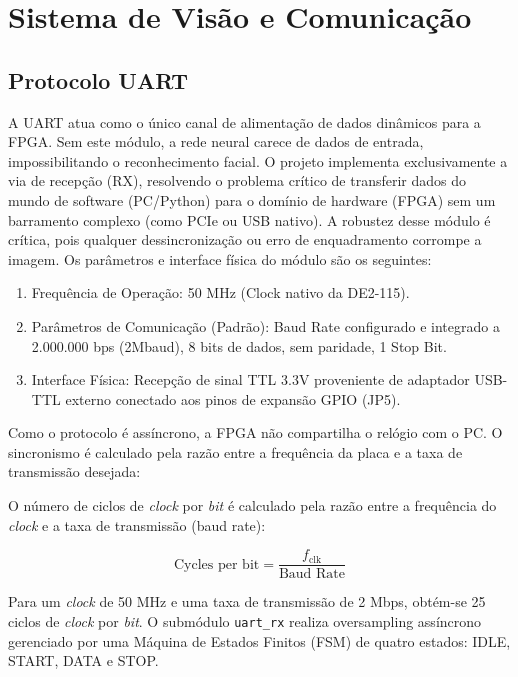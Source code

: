 \chapter{Sistema de Visão e Comunicação}
\section{Protocolo UART}
A UART atua como o único canal de alimentação de dados dinâmicos para a FPGA. Sem este módulo, a rede neural carece de dados de entrada, impossibilitando o reconhecimento facial. O projeto implementa exclusivamente a via de recepção (RX), resolvendo o problema crítico de transferir dados do mundo de software (PC/Python) para o domínio de hardware (FPGA) sem um barramento complexo (como PCIe ou USB nativo). A robustez desse módulo é crítica, pois qualquer dessincronização ou erro de enquadramento corrompe a imagem. 
Os parâmetros e interface física do módulo são os seguintes:
\begin{enumerate}[nosep]
    \item Frequência de Operação: 50 MHz (Clock nativo da DE2-115).
    \item Parâmetros de Comunicação (Padrão): Baud Rate configurado e integrado a 2.000.000 bps (2Mbaud), 8 bits de dados, sem paridade, 1 Stop Bit.
    \item Interface Física: Recepção de sinal TTL 3.3V proveniente de adaptador USB-TTL externo conectado aos pinos de expansão GPIO (JP5).
\end{enumerate}
Como o protocolo é assíncrono, a FPGA não compartilha o relógio com o PC. O sincronismo é calculado pela razão entre a frequência da placa e a taxa de transmissão desejada:

O número de ciclos de \textit{clock} por \textit{bit} é calculado pela razão entre a frequência do \textit{clock} e a taxa de transmissão (baud rate):

$$ \text{Cycles per bit} = \frac{f_{\text{clk}}}{\text{Baud Rate}} $$

Para um \textit{clock} de 50 MHz e uma taxa de transmissão de 2 Mbps, obtém-se 25 ciclos de \textit{clock} por \textit{bit}.
O submódulo \texttt{uart\_rx} realiza oversampling assíncrono gerenciado por uma Máquina de Estados Finitos (FSM) de quatro estados: IDLE, START, DATA e STOP.

